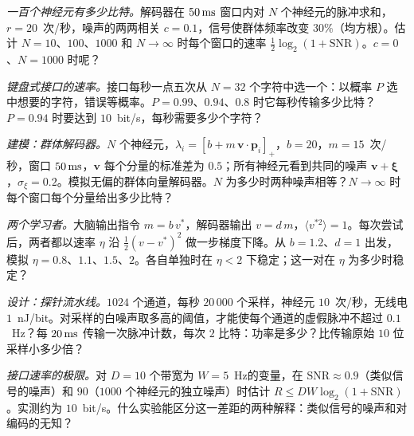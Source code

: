 \begin{exercise}[\lvlA]
\label{ex:17:2}
\emph{一百个神经元有多少比特。}解码器在 $50\,\text{ms}$ 窗口内对 $N$ 个神经元的脉冲求和，$r=20$~次/秒，噪声的两两相关 $c=0.1$，信号使群体频率改变 $30\%$（均方根）。估计 $N=10$、$100$、$1000$ 和 $N\to\infty$ 时每个窗口的速率 $\tfrac12\log_2(1+\text{SNR})$。$c=0$、$N=1000$ 时呢？
\end{exercise}

\begin{exercise}[\lvlB]
\label{ex:17:3}
\emph{键盘式接口的速率。}接口每秒一点五次从 $N=32$ 个字符中选一个：以概率 $P$ 选中想要的字符，错误等概率。$P=0.99$、$0.94$、$0.8$ 时它每秒传输多少比特？$P=0.94$ 时要达到 $10$~bit/s，每秒需要多少个字符？
\end{exercise}

\begin{exercise}[\lvlB]
\label{ex:17:4}
\emph{建模：群体解码器。}$N$ 个神经元，$\lambda_i=[b+m\,\mathbf v\cdot\mathbf p_i]_+$，$b=20$，$m=15$~次/秒，窗口 $50\,\text{ms}$，$\mathbf v$ 每个分量的标准差为 $0.5$；所有神经元看到共同的噪声 $\mathbf v+\boldsymbol\xi$，$\sigma_\xi=0.2$。模拟无偏的群体向量解码器。$N$ 为多少时两种噪声相等？$N\to\infty$ 时每个窗口每个分量给出多少比特？
\end{exercise}

\begin{exercise}[\lvlB]
\label{ex:17:5}
\emph{两个学习者。}大脑输出指令 $m=b\,v^*$，解码器输出 $v=d\,m$，$\langle v^{*2}\rangle=1$。每次尝试后，两者都以速率 $\eta$ 沿 $\tfrac12(v-v^*)^2$ 做一步梯度下降。从 $b=1.2$、$d=1$ 出发，模拟 $\eta=0.8$、$1.1$、$1.5$、$2$。各自单独时在 $\eta<2$ 下稳定；这一对在 $\eta$ 为多少时稳定？
\end{exercise}

\begin{exercise}[\lvlB]
\label{ex:17:6}
\emph{设计：探针流水线。}$1024$ 个通道，每秒 $20\,000$ 个采样，神经元 $10$~次/秒，无线电 $1$~nJ/bit。对采样的白噪声取多高的阈值，才能使每个通道的虚假脉冲不超过 $0.1$~Hz？每 $20\,\text{ms}$ 传输一次脉冲计数，每次 $2$ 比特：功率是多少？比传输原始 $10$ 位采样小多少倍？
\end{exercise}

\begin{exercise}[\lvlC]
\label{ex:17:7}
\emph{接口速率的极限。}对 $D=10$ 个带宽为 $W=5$~Hz的变量，在 $\text{SNR}\approx0.9$（类似信号的噪声）和 $90$（$1000$ 个神经元的独立噪声）时估计 $R\le DW\log_2(1+\text{SNR})$。实测约为 $10$~bit/s。什么实验能区分这一差距的两种解释：类似信号的噪声和对编码的无知？
\end{exercise}
